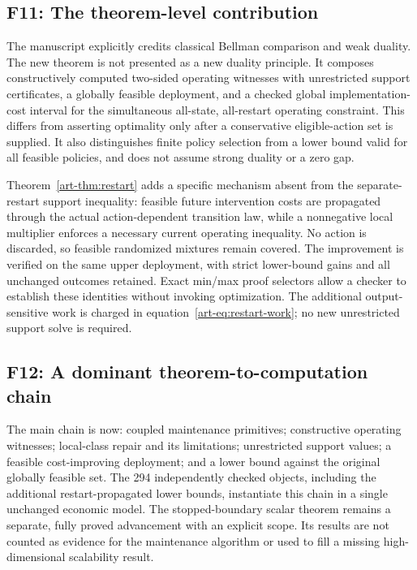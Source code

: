 \subsection{F11: The theorem-level contribution}
The manuscript explicitly credits classical Bellman comparison and weak duality. The new theorem is not presented as a new duality principle. It composes constructively computed two-sided operating witnesses with unrestricted support certificates, a globally feasible deployment, and a checked global implementation-cost interval for the simultaneous all-state, all-restart operating constraint. This differs from asserting optimality only after a conservative eligible-action set is supplied. It also distinguishes finite policy selection from a lower bound valid for all feasible policies, and does not assume strong duality or a zero gap.

Theorem~\ref{art-thm:restart} adds a specific mechanism absent from the separate-restart support inequality: feasible future intervention costs are propagated through the actual action-dependent transition law, while a nonnegative local multiplier enforces a necessary current operating inequality. No action is discarded, so feasible randomized mixtures remain covered. The improvement is verified on the same upper deployment, with \RestartTightened{} strict lower-bound gains and all unchanged outcomes retained. Exact min/max proof selectors allow a checker to establish these identities without invoking optimization. The additional output-sensitive work is charged in equation~\eqref{art-eq:restart-work}; no new unrestricted support solve is required.

\subsection{F12: A dominant theorem-to-computation chain}
The main chain is now: coupled maintenance primitives; constructive operating witnesses; local-class repair and its limitations; unrestricted support values; a feasible cost-improving deployment; and a lower bound against the original globally feasible set. The 294 independently checked objects, including the additional restart-propagated lower bounds, instantiate this chain in a single unchanged economic model. The stopped-boundary scalar theorem remains a separate, fully proved advancement with an explicit scope. Its results are not counted as evidence for the maintenance algorithm or used to fill a missing high-dimensional scalability result.

